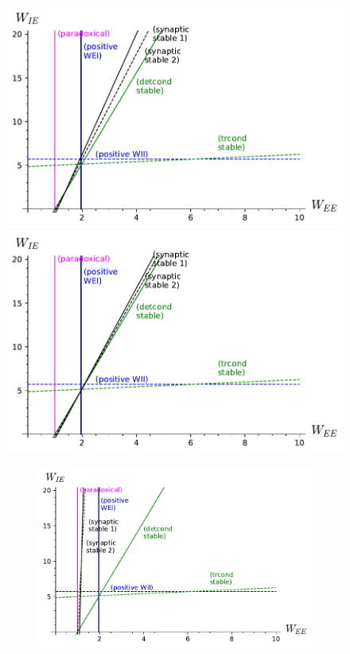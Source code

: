 \documentclass[twocolumn]{article}
\begin{document}
\begin{figure}[!ht]
\centering
\parbox[c]{\columnwidth}{
\includegraphics[width=\columnwidth]{FB_stability_equal.pdf}
\includegraphics[width=\columnwidth]{FB_stability_sloweralpha3.pdf}}
\parbox[c]{\columnwidth}{
\begin{figure}[H]
\includegraphics[width=\columnwidth]{FB_stability_fasteralpha3.pdf}

\end{figure}}
\end{figure}
\end{document}
